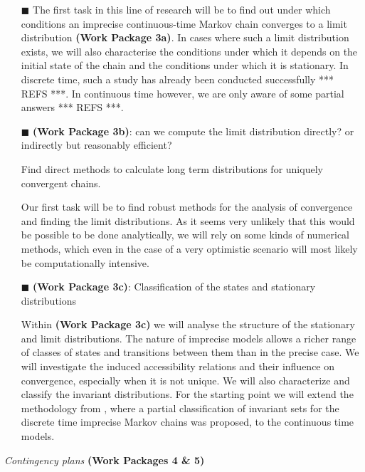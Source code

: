 \documentclass[11pt,dvipsnames,usenames,a4paper]{article}
\begin{document}
\vspace{6pt}
\begin{itemize}
\item[\tiny$\blacksquare$]
The first task in this line of research will be to find out under which conditions an imprecise continuous-time Markov chain converges to a limit distribution {\bf (Work Package 3a)}. In cases where such a limit distribution exists, we will also characterise the conditions under which it depends on the initial state of the chain and the conditions under which it is stationary. In discrete time, such a study has already been conducted successfully *** REFS ***. In continuous time however, we are only aware of some partial answers *** REFS ***. 

\item[\tiny$\blacksquare$]
{\bf (Work Package 3b)}: can we compute the limit distribution directly? or indirectly but reasonably efficient?

Find direct methods to calculate long term distributions for uniquely convergent chains. 


Our first task will be to find robust methods for the analysis of convergence and finding the limit distributions. 
As it seems very unlikely that this would be possible to be done analytically, we will rely on some kinds of numerical methods, which even in the case of a very optimistic scenario will most likely be computationally intensive.
\item[\tiny$\blacksquare$]
{\bf (Work Package 3c)}: Classification of the states and stationary distributions

Within {\bf (Work Package 3c)} we will analyse the structure of the stationary and limit distributions. The nature of imprecise models allows a richer range of classes of states and transitions between them than in the precise case. We will investigate the induced accessibility relations and their influence on convergence, especially when it is not unique. We will also characterize and classify the invariant distributions. For the starting point we will extend the methodology from \cite{skulj:13b}, where a partial classification of invariant sets for the discrete time imprecise Markov chains was proposed, to the continuous time models. 

\vspace{8pt}
\end{itemize}

\emph{Contingency plans} {\bf (Work Packages 4 \& 5)} 
\vspace{3pt}
\end{document}
